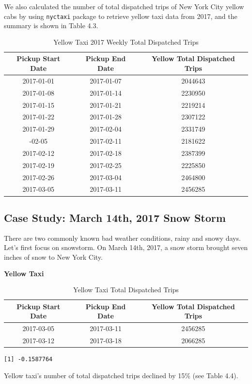 \documentclass[12pt,twoside]{reedthesis}
\theoremstyle{definition}
\theoremstyle{definition}
\theoremstyle{definition}
\theoremstyle{remark}
\begin{document}
We also calculated the number of total dispatched trips of New York City
yellow cabs by using \texttt{nyctaxi} package to retrieve yellow taxi
data from 2017, and the summary is shown in Table 4.3.
\begin{table}

\caption{\label{tab:unnamed-chunk-65}Yellow Taxi 2017 Weekly Total Dispatched Trips}
\centering
\begin{tabular}[t]{ccc}
\toprule
Pickup Start Date & Pickup End Date & Yellow Total Dispatched Trips\\
\midrule
2017-01-01 & 2017-01-07 & 2044643\\
2017-01-08 & 2017-01-14 & 2230950\\
2017-01-15 & 2017-01-21 & 2219214\\
2017-01-22 & 2017-01-28 & 2307122\\
2017-01-29 & 2017-02-04 & 2331749\\
\addlinespace
2017-02-05 & 2017-02-11 & 2181622\\
2017-02-12 & 2017-02-18 & 2387399\\
2017-02-19 & 2017-02-25 & 2225850\\
2017-02-26 & 2017-03-04 & 2464800\\
2017-03-05 & 2017-03-11 & 2456285\\
\bottomrule
\end{tabular}
\end{table}
\subsection{Case Study: March 14th, 2017 Snow
Storm}\label{case-study-march-14th-2017-snow-storm}

There are two commonly known bad weather conditions, rainy and snowy
days. Let's first focus on snowstorm. On March 14th, 2017, a snow storm
brought seven inches of snow to New York City.

\textbf{Yellow Taxi}
\begin{table}

\caption{\label{tab:unnamed-chunk-67}Yellow Taxi Total Dispatched Trips}
\centering
\begin{tabular}[t]{ccc}
\toprule
Pickup Start Date & Pickup End Date & Yellow Total Dispatched Trips\\
\midrule
2017-03-05 & 2017-03-11 & 2456285\\
2017-03-12 & 2017-03-18 & 2066285\\
\bottomrule
\end{tabular}
\end{table}
\begin{verbatim}
[1] -0.1587764
\end{verbatim}
Yellow taxi's number of total dispatched trips declined by 15\% (see
Table 4.4).
\end{document}
